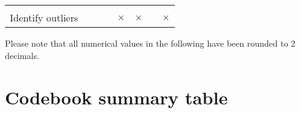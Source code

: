 \documentclass[]{article}
\begin{document}
\begin{longtable}[]{@{}lccccccc@{}}
\begin{minipage}[t]{0.06\columnwidth}
\end{minipage}\tabularnewline
\begin{minipage}[t]{0.33\columnwidth}\raggedright
Identify outliers\strut
\end{minipage} & \begin{minipage}[t]{0.07\columnwidth}\centering
\strut
\end{minipage} & \begin{minipage}[t]{0.07\columnwidth}\centering
\strut
\end{minipage} & \begin{minipage}[t]{0.07\columnwidth}\centering
\strut
\end{minipage} & \begin{minipage}[t]{0.07\columnwidth}\centering
\(\times\)\strut
\end{minipage} & \begin{minipage}[t]{0.07\columnwidth}\centering
\(\times\)\strut
\end{minipage} & \begin{minipage}[t]{0.06\columnwidth}\centering
\strut
\end{minipage} & \begin{minipage}[t]{0.06\columnwidth}\centering
\(\times\)\strut
\end{minipage}\tabularnewline
\bottomrule
\end{longtable}

Please note that all numerical values in the following have been rounded
to 2 decimals.

\hypertarget{codebook-summary-table}{%
\section{Codebook summary table}\label{codebook-summary-table}}
\end{document}
